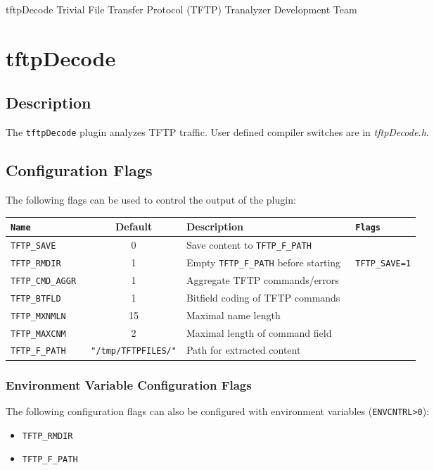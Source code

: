 \documentclass[documentation]{subfiles}
\begin{document}
\trantitle
    {tftpDecode}
    {Trivial File Transfer Protocol (TFTP)}
    {Tranalyzer Development Team} %

\section{tftpDecode}\label{s:tftpDecode}

\subsection{Description}
The {\tt tftpDecode} plugin analyzes TFTP traffic.
User defined compiler switches are in {\em tftpDecode.h}.

\subsection{Configuration Flags}
The following flags can be used to control the output of the plugin:
\begin{longtable}{>{\tt}lcl>{\tt\small}l}
    \toprule
    {\bf Name} & {\bf Default} & {\bf Description} & {\bf Flags}\\
    \midrule\endhead%
    TFTP\_SAVE      &  0 & Save content to {\tt\small TFTP\_F\_PATH}       & \\
    TFTP\_RMDIR     &  1 & Empty {\tt\small TFTP\_F\_PATH} before starting & TFTP\_SAVE=1\\
    TFTP\_CMD\_AGGR &  1 & Aggregate TFTP commands/errors                  & \\
    TFTP\_BTFLD     &  1 & Bitfield coding of TFTP commands                & \\
    TFTP\_MXNMLN    & 15 & Maximal name length                             & \\
    TFTP\_MAXCNM    &  2 & Maximal length of command field                 & \\
    TFTP\_F\_PATH   & {\tt\small "/tmp/TFTPFILES/"}
                         & Path for extracted content                      & \\
    \bottomrule
\end{longtable}

\subsubsection{Environment Variable Configuration Flags}
The following configuration flags can also be configured with environment variables ({\tt ENVCNTRL>0}):
\begin{itemize}
    \item {\tt TFTP\_RMDIR}
    \item {\tt TFTP\_F\_PATH}
\end{itemize}
\end{document}
